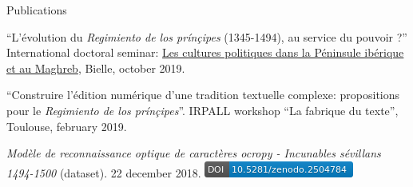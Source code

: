 











\begin{rubric}{Publications}
                    
                
                    
                    \entry*
                \enquote{L'évolution du \textit{Regimiento de los prínçipes}
                        (1345-1494), au service du pouvoir ?} International doctoral seminar:
                        \href{https://recherche.univ-pau.fr/fr/accueil/cpim.html}{Les cultures
                        politiques dans la Péninsule ibérique et au Maghreb},
                        Bielle, october 2019. 
                    
                    \entry*
                \enquote{Construire l'édition numérique d'une tradition textuelle
                        complexe: propositions pour le \textit{Regimiento de los
                        prínçipes}}. IRPALL workshop \enquote{La fabrique du texte},
                        Toulouse, february 2019.
            
                    
                    \entry*
                \textit{Modèle de reconnaissance optique de caractères ocropy -
                        Incunables sévillans 1494-1500} (dataset). 22 december 2018. \href{https://doi.org/10.5281/zenodo.2504783}{\includegraphics[scale=0.55]{img/zenodo2504784.png}}\end{rubric}


